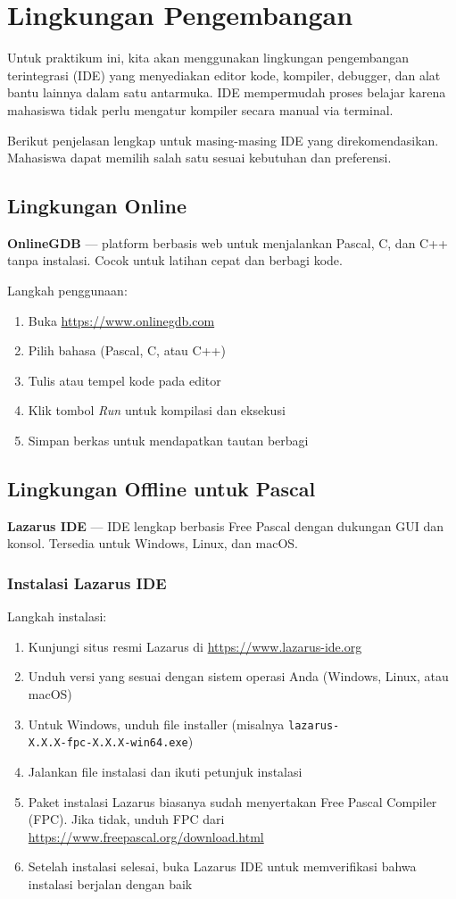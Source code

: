 \documentclass[../main.tex]{subfiles}
\begin{document}
\section{Lingkungan Pengembangan}
Untuk praktikum ini, kita akan menggunakan lingkungan pengembangan terintegrasi (IDE) yang menyediakan editor kode, kompiler, debugger, dan alat bantu lainnya dalam satu antarmuka. IDE mempermudah proses belajar karena mahasiswa tidak perlu mengatur kompiler secara manual via terminal.

Berikut penjelasan lengkap untuk masing-masing IDE yang direkomendasikan. Mahasiswa dapat memilih salah satu sesuai kebutuhan dan preferensi.

\subsection{Lingkungan Online}
\textbf{OnlineGDB} \parencite{onlinegdb} — platform berbasis web untuk menjalankan Pascal, C, dan C++ tanpa instalasi. Cocok untuk latihan cepat dan berbagi kode.

Langkah penggunaan:
\begin{enumerate}
  \item Buka \url{https://www.onlinegdb.com}
  \item Pilih bahasa (Pascal, C, atau C++)
  \item Tulis atau tempel kode pada editor
  \item Klik tombol \emph{Run} untuk kompilasi dan eksekusi
  \item Simpan berkas untuk mendapatkan tautan berbagi
\end{enumerate}

\subsection{Lingkungan Offline untuk Pascal}
\textbf{Lazarus IDE} \parencite{lazarus} — IDE lengkap berbasis Free Pascal dengan dukungan GUI dan konsol. Tersedia untuk Windows, Linux, dan macOS.

\subsubsection{Instalasi Lazarus IDE}
Langkah instalasi:
\begin{enumerate}
  \item Kunjungi situs resmi Lazarus di \url{https://www.lazarus-ide.org}
  \item Unduh versi yang sesuai dengan sistem operasi Anda (Windows, Linux, atau macOS)
  \item Untuk Windows, unduh file installer (misalnya \texttt{lazarus-}\\\texttt{X.X.X-fpc-X.X.X-win64.exe})
  \item Jalankan file instalasi dan ikuti petunjuk instalasi
  \item Paket instalasi Lazarus biasanya sudah menyertakan Free Pascal Compiler (FPC). Jika tidak, unduh FPC dari \url{https://www.freepascal.org/download.html}
  \item Setelah instalasi selesai, buka Lazarus IDE untuk memverifikasi bahwa instalasi berjalan dengan baik
\end{enumerate}
\end{document}

